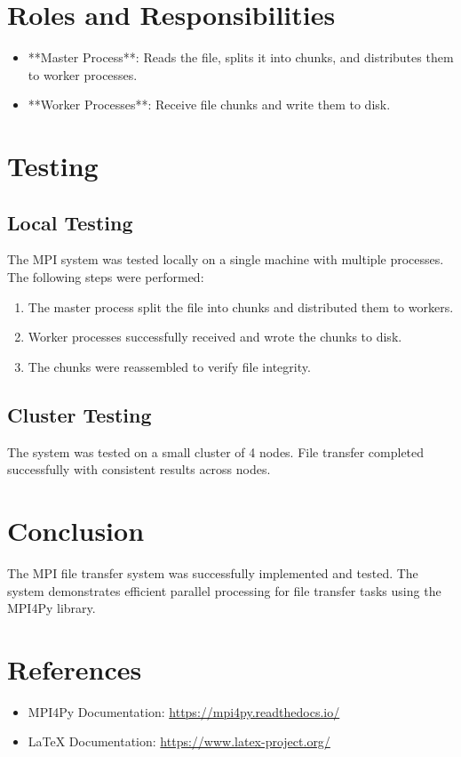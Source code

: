 \documentclass[a4paper,12pt]{article}
\begin{document}
\section*{Roles and Responsibilities}
\begin{itemize}
    \item **Master Process**: Reads the file, splits it into chunks, and distributes them to worker processes.
    \item **Worker Processes**: Receive file chunks and write them to disk.
\end{itemize}

\section*{Testing}
\subsection*{Local Testing}
The MPI system was tested locally on a single machine with multiple processes. The following steps were performed:
\begin{enumerate}
    \item The master process split the file into chunks and distributed them to workers.
    \item Worker processes successfully received and wrote the chunks to disk.
    \item The chunks were reassembled to verify file integrity.
\end{enumerate}

\subsection*{Cluster Testing}
The system was tested on a small cluster of 4 nodes. File transfer completed successfully with consistent results across nodes.

\section*{Conclusion}
The MPI file transfer system was successfully implemented and tested. The system demonstrates efficient parallel processing for file transfer tasks using the MPI4Py library.

\section*{References}
\begin{itemize}
    \item MPI4Py Documentation: \url{https://mpi4py.readthedocs.io/}
    \item LaTeX Documentation: \url{https://www.latex-project.org/}
\end{itemize}
\end{document}
